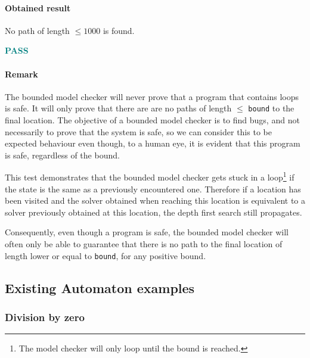 \documentclass[letterpaper,12pt]{article}
\begin{document}
\paragraph{Obtained result}
No path of length $\leq 1000$ is found.
 
\textbf{\textcolor{teal}{PASS}}

\paragraph{Remark}
The bounded model checker will never prove that a program that contains loops is safe. It will only prove that there are are no paths of length $\leq$ \texttt{bound} to the final location. The objective of a bounded model checker is to find bugs, and not necessarily to prove that the system is safe, so we can consider this to be expected behaviour even though, to a human eye, it is evident that this program is safe, regardless of the bound.

This test demonstrates that the bounded model checker gets stuck in a loop\footnote{The model checker will only loop until the bound is reached.} if the state is the same as a previously encountered one. Therefore if a location has been visited and the solver obtained when reaching this location is equivalent to a solver previously obtained at this location, the depth first search still propagates.

Consequently, even though a program is safe, the bounded model checker will often only be able to guarantee that there is no path to the final location of length lower or equal to \texttt{bound}, for any positive bound.

\subsection{Existing Automaton examples}
\subsubsection{Division by zero}
  
\end{document}

